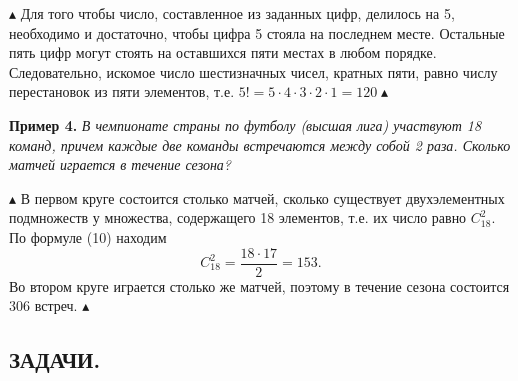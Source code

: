 \documentclass{article}
\begin{document}
    \fontsize{13}{10}\selectfont $\blacktriangle$ Для того чтобы число, составленное из заданных цифр, делилось на 5, необходимо и достаточно, чтобы цифра 5 стояла на последнем месте. Остальные пять цифр могут стоять на оставшихся пяти местах в любом порядке. Следовательно, искомое число шестизначных чисел, кратных пяти, равно числу перестановок из пяти элементов, т.е. $5!=5\cdot4\cdot3\cdot2\cdot1=120\blacktriangle$

    \textbf{Пример 4.} \textit{В чемпионате страны по футболу (высшая лига) участвуют 18 команд, причем каждые две команды встречаются между собой 2 раза. Сколько матчей играется в течение сезона?}

    \fontsize{13}{10}\selectfont $\blacktriangle$ В первом круге состоится столько матчей, сколько существует двухэлементных подмножеств у множества, содержащего 18 элементов, т.е. их число равно $C_18^2$. По формуле (10) находим \begin{equation*}
                                                                                                                                                                                                                                          C_{18}^2=\frac{18\cdot17}{2}=153.
    \end{equation*}
    Во втором круге играется столько же матчей, поэтому в течение сезона состоится 306 встреч. $\blacktriangle$

    \subsection*{ЗАДАЧИ.}
\end{document}
